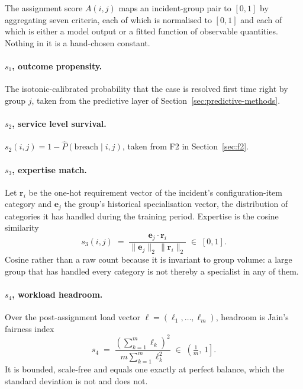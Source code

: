 The assignment score $A(i,j)$ maps an incident-group pair to $[0,1]$ by aggregating seven
criteria, each of which is normalised to $[0,1]$ and each of which is either a model output or
a fitted function of observable quantities. Nothing in it is a hand-chosen constant.

\paragraph{$s_1$, outcome propensity.} The isotonic-calibrated probability that the case is
resolved first time right by group $j$, taken from the predictive layer of
Section~\ref{sec:predictive-methods}.

\paragraph{$s_2$, service level survival.} $s_2(i,j) = 1 - \hat{P}(\text{breach} \mid i, j)$,
taken from F2 in Section~\ref{sec:f2}.

\paragraph{$s_3$, expertise match.} Let $\mathbf{r}_i$ be the one-hot requirement vector of the
incident's configuration-item category and $\mathbf{e}_j$ the group's historical specialisation
vector, the distribution of categories it has handled during the training period. Expertise is
the cosine similarity
\begin{equation}
s_3(i,j) \;=\; \frac{\mathbf{e}_j \cdot \mathbf{r}_i}
{\lVert \mathbf{e}_j \rVert_2 \,\lVert \mathbf{r}_i \rVert_2} \;\in\; [0,1].
\label{eq:cosine}
\end{equation}
Cosine rather than a raw count because it is invariant to group volume: a large group that has
handled every category is not thereby a specialist in any of them.

\paragraph{$s_4$, workload headroom.} Over the post-assignment load vector
$\boldsymbol{\ell} = (\ell_1,\dots,\ell_m)$, headroom is Jain's fairness index
\citep{jain1984quantitative}
\begin{equation}
s_4 \;=\; \frac{\left(\sum_{k=1}^{m} \ell_k\right)^2}{m \sum_{k=1}^{m} \ell_k^2}
\;\in\; \left(\tfrac{1}{m},\, 1\right].
\label{eq:jain}
\end{equation}
It is bounded, scale-free and equals one exactly at perfect balance, which the standard
deviation is not and does not.

